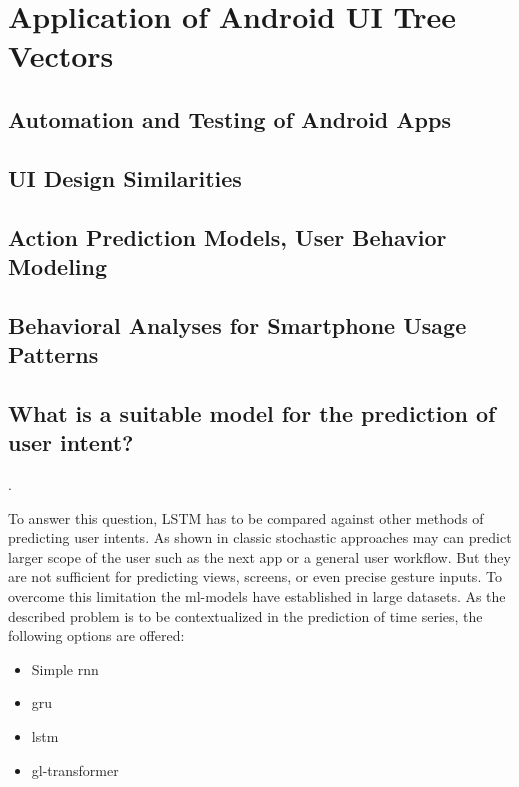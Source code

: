 \chapter{Application of Android UI Tree Vectors}


\section{Automation and Testing of Android Apps}
\section{UI Design Similarities}
\section{Action Prediction Models, User Behavior Modeling}
\section{Behavioral Analyses for Smartphone Usage Patterns}


\section{What is a suitable model for the prediction of user intent?}.

To answer this question, LSTM has to be compared against other methods of predicting user intents.
As shown in  classic stochastic approaches may can predict larger scope of the user such as the next app or a general user workflow.
But they are not sufficient for predicting views, screens, or even precise gesture inputs.
To overcome this limitation the \gls{ml}-models have established in large datasets.
As the described problem is to be contextualized in the prediction of time series, the following options are offered:
\begin{itemize}
    \item Simple \gls{rnn}
    \item \gls{gru}
    \item \gls{lstm}
    \item \gls{gl-transformer}
\end{itemize}

